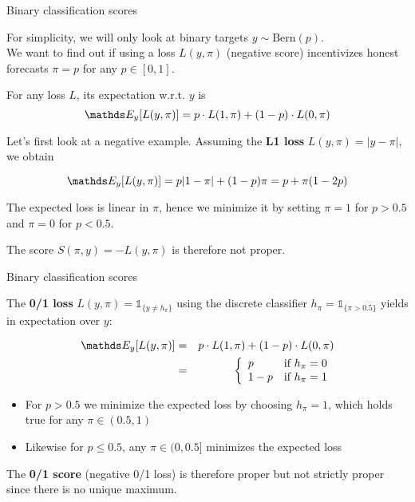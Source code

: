 \documentclass[11pt,compress,t,notes=noshow, xcolor=table]{beamer}
\begin{document}
\begin{vbframe}{Binary classification scores}

For simplicity, we will only look at binary targets $y \sim \text{Bern}(p)$.\\ %
We want to find out if using a loss $L(y, \pi)$ (negative score) incentivizes honest forecasts $\pi=p$ for any $p \in [0,1]$.

\lz

For any loss $L$, its expectation w.r.t. $y$ is
$$\E_{y}[L(y, \pi)]=p \cdot L(1, \pi) + (1-p) \cdot L(0, \pi)$$

\vspace{0.2cm}

Let's first look at a negative example. Assuming the \textbf{L1 loss} $L(y,\pi)=|y-\pi|$, we obtain

$$\E_y[L(y, \pi)]=p |1-\pi| + (1-p) \pi = p+\pi(1-2p)$$

\vspace{0.2cm}

The expected loss is linear in $\pi$, hence we minimize it by setting $\pi = 1$ for $p>0.5$ and $\pi = 0$ for $p<0.5$. 

\vspace{0.2cm}

The score $S(\pi,y)=-L(y,\pi)$ is therefore not proper.

\end{vbframe}

\begin{vbframe}{Binary classification scores}

The \textbf{0/1 loss} $L(y,\pi)=\mathds{1}_{\{y \neq h_\pi\}}$ using the discrete classifier $h_{\pi}=\mathds{1}_{\{\pi>0.5\}}$ yields in expectation over $y$:

\begin{eqnarray*}
\E_y[L(y, \pi)] &=& p \cdot L(1,\pi) + (1-p) \cdot L(0,\pi)\\
&=& \left\{
\begin{array}{ll}
p & \text{if } h_{\pi} = 0 \\
1-p & \text{if } h_{\pi} = 1
\end{array}
\right.
\end{eqnarray*}

\begin{itemize}
    \item For $p>0.5$ we minimize the expected loss by choosing $h_{\pi}=1$, which holds true for any $\pi \in (0.5,1)$
    \item Likewise for $p\leq 0.5$, any $\pi \in (0, 0.5]$ minimizes the expected loss
\end{itemize}

\lz

The \textbf{0/1 score} (negative 0/1 loss) is therefore proper but not strictly proper since there is no unique maximum.

\end{vbframe}
\end{document}
